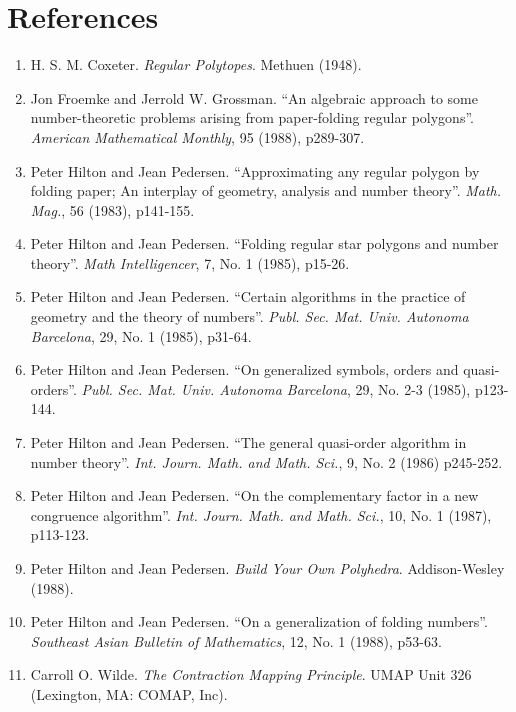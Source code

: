 \newpage

\section*{References}


\begin{enumerate}[1.]
  \item H. S. M. Coxeter. \emph{Regular Polytopes}. Methuen (1948).
  \item Jon Froemke and Jerrold W. Grossman. ``An algebraic approach to some number-theoretic problems arising from paper-folding regular polygons''. $\ $ \emph{American Mathematical Monthly}, 95 (1988), p289-307.
  \item Peter Hilton and Jean Pedersen. ``Approximating any regular polygon by folding paper; An interplay of geometry, analysis and number theory''. \emph{Math. Mag.}, 56 (1983), p141-155.
  \item Peter Hilton and Jean Pedersen. ``Folding regular star polygons and number theory''. \emph{Math Intelligencer}, 7, No. 1 (1985), p15-26.
  \item Peter Hilton and Jean Pedersen. ``Certain algorithms in the practice of geometry and the theory of numbers''. \emph{Publ. Sec. Mat. Univ. Autonoma Barcelona}, 29, No. 1 (1985), p31-64.
  \item Peter Hilton and Jean Pedersen. ``On generalized symbols, orders and quasi-orders''. \emph{Publ. Sec. Mat. Univ. Autonoma Barcelona}, 29, No. 2-3 (1985), p123-144.
  \item Peter Hilton and Jean Pedersen. ``The general quasi-order algorithm in number theory''. \emph{Int. Journ. Math. and Math. Sci.}, 9, No. 2 (1986) p245-252.
  \item Peter Hilton and Jean Pedersen. ``On the complementary factor in a new congruence algorithm''. \emph{Int. Journ. Math. and Math. Sci.}, 10, No. 1 (1987), p113-123.
  \item Peter Hilton and Jean Pedersen. \emph{Build Your Own Polyhedra}. Addison-Wesley (1988).
  \item Peter Hilton and Jean Pedersen. ``On a generalization of folding numbers''. \emph{Southeast Asian Bulletin of Mathematics}, 12, No. 1 (1988), p53-63.
  \item Carroll O. Wilde. \emph{The Contraction Mapping Principle}. UMAP Unit 326 (Lexington, MA: COMAP, Inc).
\end{enumerate}




